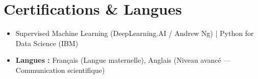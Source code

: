 \documentclass[a4paper,11pt]{article}
\begin{document}
\section{Certifications \& Langues}
\begin{itemize}[leftmargin=*, nosep]
\item \small{Supervised Machine Learning (DeepLearning.AI / Andrew Ng) | Python for Data Science (IBM)}
\item \small{\textbf{Langues :} Français (Langue maternelle), Anglais (Niveau avancé — Communication scientifique)}
\end{itemize}
\end{document}
